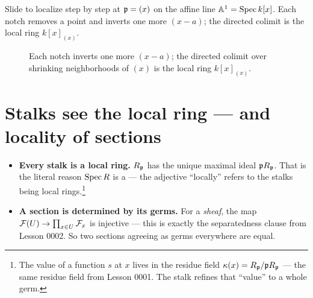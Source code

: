 Slide to localize step by step at $\mathfrak{p}=(x)$ on the affine line $\mathbb{A}^1=\operatorname{Spec} k[x]$. Each notch removes a
point and inverts one more $(x-a)$; the directed colimit is the local ring $k[x]_{(x)}$.

\begin{figure}[ht]
\centering
{}
\caption{Each notch inverts one more $(x-a)$; the directed colimit over shrinking neighborhoods of
$(x)$ is the local ring $k[x]_{(x)}$.}
\end{figure}

\section{Stalks see the local ring --- and locality of sections}

\begin{itemize}[leftmargin=1.4em,itemsep=4pt]
  \item \textbf{Every stalk is a local ring.} $R_{\mathfrak{p}}$ has the unique maximal ideal $\mathfrak{p} R_{\mathfrak{p}}$. That
  is the literal reason $\operatorname{Spec} R$ is a  --- the adjective ``locally'' refers
  to the stalks being local rings.\footnote{The value of a function $s$ at $x$ lives in the residue field
  $\kappa(x)=R_{\mathfrak{p}}/\mathfrak{p} R_{\mathfrak{p}}$ --- the same residue field from Lesson 0001. The stalk refines that
  ``value'' to a whole germ.}
  \item \textbf{A section is determined by its germs.} For a \emph{sheaf}, the map
  $\mathcal{F}(U)\to\prod_{x\in U}\mathcal{F}_x$ is injective --- this is exactly the separatedness clause from Lesson
  0002. So two sections agreeing as germs everywhere are equal.
\end{itemize}

